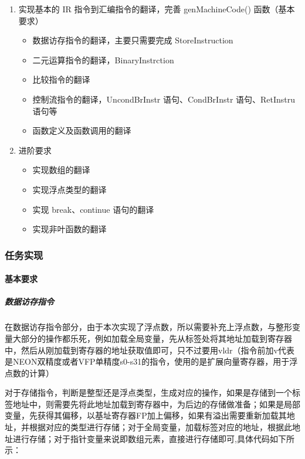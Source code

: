 \documentclass[UTF8,a4paper,10pt]{ctexart}
\begin{document}
\begin{enumerate}
  \item 实现基本的 IR 指令到汇编指令的翻译，完善 genMachineCode() 函数（基本要求）
  \begin{itemize}
    \item 数据访存指令的翻译，主要只需要完成 StoreInstruction
    \item 二元运算指令的翻译，BinaryInstrction
    \item 比较指令的翻译
    \item 控制流指令的翻译，UncondBrInstr 语句、CondBrInstr 语句、RetInstru 语句等
    \item 函数定义及函数调用的翻译
  \end{itemize}
  \item 进阶要求
  \begin{itemize}
    \item 实现数组的翻译
    \item 实现浮点类型的翻译
    \item 实现 break、continue 语句的翻译
    \item 实现非叶函数的翻译
  \end{itemize}
\end{enumerate}


\subsubsection{任务实现}
\paragraph{基本要求}
\subparagraph{数据访存指令}
在数据访存指令部分，由于本次实现了浮点数，所以需要补充上浮点数，与整形变量大部分的操作都乐死，例如加载全局变量，先从标签处将其地址加载到寄存器中，然后从刚加载到寄存器的地址获取值即可，只不过要用vldr（指令前加v代表是NEON双精度或者VFP单精度s0-s31的指令，使用的是扩展向量寄存器，用于浮点数的计算）

对于存储指令，判断是整型还是浮点类型，生成对应的操作，如果是存储到一个标签地址中，则需要先将此地址加载到寄存器中，为后边的存储做准备；如果是局部变量，先获得其偏移，以基址寄存器FP加上偏移，如果有溢出需要重新加载其地址，并根据对应的类型进行存储；对于全局变量，加载标签对应的地址，根据此地址进行存储；对于指针变量来说即数组元素，直接进行存储即可,具体代码如下所示：
\end{document}
